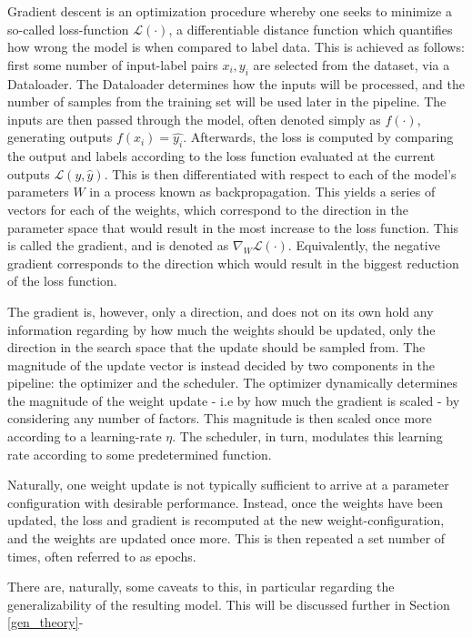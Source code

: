         Gradient descent is an optimization procedure whereby one seeks to minimize a so-called loss-function \(\mathcal{L}(\cdot)\), a differentiable distance function which quantifies how wrong the model is when compared to label data. This is achieved as follows: first some number of input-label pairs \({x_i,y_i}\) are selected from the dataset, via a Dataloader. The Dataloader determines how the inputs will be processed, and the number of samples from the training set will be used later in the pipeline. The inputs are then passed through the model, often denoted simply as \(f(\cdot)\), generating outputs \(f(x_i)=\hat{y_i}\). Afterwards, the loss is computed by comparing the output and labels according to the loss function evaluated at the current outputs \(\mathcal{L}(y, \hat{y})\). This is then differentiated with respect to each of the model's parameters \(W\) in a process known as backpropagation. This yields a series of vectors for each of the weights, which correspond to the direction in the parameter space that would result in the most increase to the loss function. This is called the gradient, and is denoted as \(\nabla_{W} \mathcal{L}(\cdot)\). Equivalently, the negative gradient corresponds to the direction which would result in the biggest reduction of the loss function.
        
        The gradient is, however, only a direction, and does not on its own hold any information regarding by how much the weights should be updated, only the direction in the search space that the update should be sampled from. The magnitude of the update vector is instead decided by two components in the pipeline: the optimizer and the scheduler. The optimizer dynamically determines the magnitude of the weight update - i.e by how much the gradient is scaled - by considering any number of factors. This magnitude is then  scaled once more according to a learning-rate \(\eta\). The scheduler, in turn, modulates this learning rate according to some predetermined function. 
    
        Naturally, one weight update is not typically sufficient to arrive at a parameter configuration with desirable performance. Instead, once the weights have been updated, the loss and gradient is recomputed at the new weight-configuration, and the weights are updated once more. This is then repeated a set number of times, often referred to as epochs. 
        
        There are, naturally, some caveats to this, in particular regarding the generalizability of the resulting model. This will be discussed further in Section \ref{gen_theory}-

